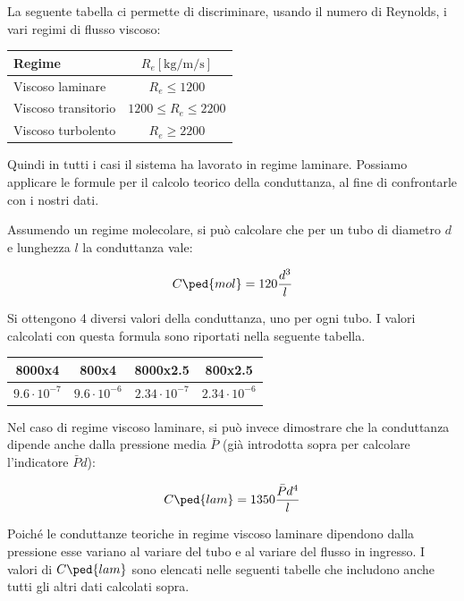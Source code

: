 La seguente tabella ci permette di discriminare, usando il numero di Reynolds, i vari regimi di flusso viscoso:

\begin{center}
    \begin{tabular}{l c }
        \toprule
        Regime & $R_e [\si{\kg\per\m\per\s}]$ \\
        \midrule
        Viscoso laminare    & $R_e \le 1200$ \\
        Viscoso transitorio & $1200 \le R_e \le 2200$ \\
        Viscoso turbolento  & $R_e \ge 2200$ \\
        \bottomrule
    \end{tabular}
\end{center}

Quindi in tutti i casi il sistema ha lavorato in regime laminare. Possiamo applicare le formule per il calcolo
teorico della conduttanza, al fine di confrontarle con i nostri dati.

Assumendo un regime molecolare, si può calcolare che per un tubo di diametro $d$ e lunghezza $l$ la conduttanza vale:

\begin{equation}
    C\ped{mol} = 120 \frac{d^3}{l}
\end{equation}

Si ottengono 4 diversi valori della conduttanza, uno per ogni tubo. I valori calcolati con questa formula
sono riportati nella seguente tabella.

\begin{center}
    \begin{tabular}{c c c c}
        \toprule
        8000x4 & 800x4 & 8000x2.5 & 800x2.5 \\
        \midrule
        $9.6 \cdot 10^{-7}$ & $9.6 \cdot 10^{-6}$ & $2.34 \cdot 10^{-7}$ & $2.34 \cdot 10^{-6}$ \\
        \bottomrule
    \end{tabular}
\end{center}

Nel caso di regime viscoso laminare, si può invece dimostrare che la conduttanza dipende anche dalla pressione media
$\bar{P}$ (già introdotta sopra per calcolare l'indicatore $\bar{P}d$):

\begin{equation}
    C\ped{lam} = 1350 \frac{\bar{P} d^4}{l}
\end{equation}

Poiché le conduttanze teoriche in regime viscoso laminare dipendono dalla pressione esse variano al variare del tubo 
e al variare del flusso in ingresso. I valori di $C\ped{lam}$ sono elencati nelle seguenti tabelle che includono anche
tutti gli altri dati calcolati sopra.

